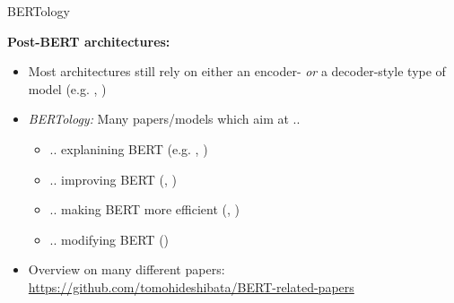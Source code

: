 \documentclass[]{beamer}
\begin{document}
\begin{frame}{BERTology \href{https://arxiv.org/pdf/2002.12327.pdf}{}}\label{bert-lit}

\textbf{Post-BERT architectures:}

\begin{itemize}
\item Most architectures still rely on either an encoder- \textit{or} a decoder-style type of model (e.g. \href{https://cdn.openai.com/better-language-models/language_models_are_unsupervised_multitask_learners.pdf}{}, \href{https://arxiv.org/pdf/1906.08237.pdf}{})
\item \textit{BERTology:} Many papers/models which aim at ..
			\begin{itemize}
				\item .. explanining BERT (e.g. \href{https://arxiv.org/pdf/1906.02715.pdf}{}, \href{https://arxiv.org/pdf/1905.10650.pdf}{})
				\item .. improving BERT (\href{https://arxiv.org/pdf/1907.11692.pdf}{}, \href{https://arxiv.org/pdf/1909.11942.pdf}{})
				\item .. making BERT more efficient (\href{https://arxiv.org/pdf/1909.11942.pdf}{}, \href{https://arxiv.org/pdf/1910.01108.pdf}{})
				\item .. modifying BERT (\href{https://arxiv.org/pdf/1910.13461.pdf}{})
			\end{itemize}
\item Overview on many different papers:\\
			\href{https://github.com/tomohideshibata/BERT-related-papers}{https://github.com/tomohideshibata/BERT-related-papers}
\end{itemize}
\end{frame}
\end{document}
